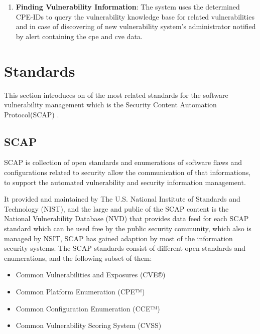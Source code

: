 \documentclass{llncs}
\begin{document}
\begin{enumerate}
   \item \textbf{Finding Vulnerability Information}: The system uses the determined CPE-IDs to query the vulnerability knowledge base for related vulnerabilities and in case of discovering of new vulnerability system's administrator notified by alert containing the cpe and cve data.      
   
 
 \end{enumerate}



\section{Standards}
This section introduces on of the most related standards for the software vulnerability management which is the Security Content Automation Protocol(SCAP) \cite{scap}.


\subsection{SCAP}

\par SCAP is collection of open standards and enumerations of software flaws and configurations related to security allow the communication of that informations, to support the automated vulnerability and security information management. \par   
 It provided and maintained by The U.S. National Institute of Standards and Technology (NIST)\cite{nsit}, and the large and public of the SCAP content is the National Vulnerability Database (NVD)\cite{nvd} that provides data feed for each SCAP standard which can be used free by the public security community, which also is managed by NSIT, SCAP has gained adaption by most of the information security systems.  
 The SCAP standards consist of different open standards and enumerations, and the following subset of them:
 
 \begin{itemize}
 \item Common Vulnerabilities and Exposures (CVE®)
 \item Common Platform Enumeration (CPE™)
 \item  Common Configuration Enumeration (CCE™)
 \item Common Vulnerability Scoring System (CVSS)
 \end{itemize}
 
\end{document}
